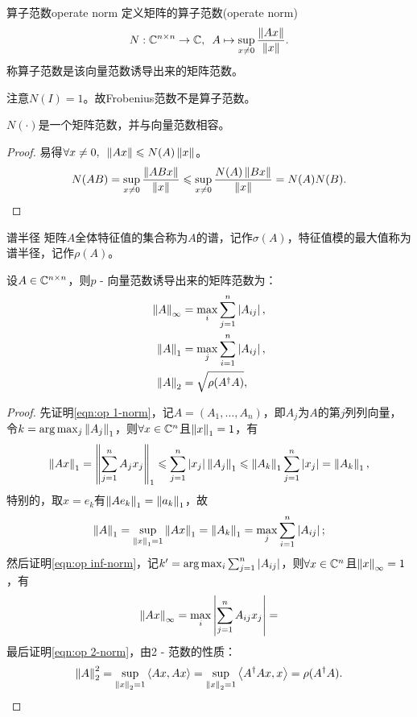 \begin{definition}
    {算子范数}{operate norm}
    定义矩阵的算子范数(operate norm)
    \begin{equation}
        N:\mathbb C^{n\times n}\to\mathbb C,\enspace A\mapsto\sup_{x\neq 0}\frac{\left\lVert Ax\right\rVert}{\left\lVert x\right\rVert}.
    \end{equation}
    称算子范数是该向量范数诱导出来的矩阵范数。
\end{definition}

注意$N(I)=1$。故Frobenius范数不是算子范数。

\begin{theorem}
    {}{}
    $N(\cdot)$是一个矩阵范数，并与向量范数相容。 
\end{theorem}

\begin{proof}
    易得$\forall x\neq 0,\enspace\left\lVert Ax\right\rVert\leqslant N(A)\left\lVert x\right\rVert$。
    \[
        N(AB)=\sup_{x\neq 0}\frac{\left\lVert ABx\right\rVert}{\left\lVert x\right\rVert}\leqslant\sup_{x\neq 0}\frac{N(A)\left\lVert Bx\right\rVert}{\left\lVert x\right\rVert}=N(A)N(B).
        \qedhere
    \]
\end{proof}

\begin{definition}
    {谱半径}{}
    矩阵$A$全体特征值的集合称为$A$的谱，记作$\sigma(A)$，特征值模的最大值称为谱半径，记作$\rho(A)$。
\end{definition}

\begin{example}
    {}{}
    设$A\in\mathbb C^{n\times n}$，则$p$ - 向量范数诱导出来的矩阵范数为：
    \begin{subequations}
        \label{eqn:op norm}
        \begin{align}
            \label{eqn:op inf-norm}
            \left\lVert A\right\rVert_\infty&=\max_{i}\sum_{j=1}^n\left\lvert A_{ij}\right\rvert,\\
            \label{eqn:op 1-norm}
            \left\lVert A\right\rVert_1&=\max_{j}\sum_{i=1}^n\left\lvert A_{ij}\right\rvert,\\
            \label{eqn:op 2-norm}
            \left\lVert A\right\rVert_2&=\sqrt{\rho(A^\dagger A)},
        \end{align}
    \end{subequations}
    \begin{proof}
        先证明\eqref{eqn:op 1-norm}，记$A=(A_1,\ldots,A_n)$，即$A_j$为$A$的第$j$列列向量，令$k=\arg\max_j\left\lVert A_j\right\rVert_1$，则$\forall x\in\mathbb C^n$且$\left\lVert x\right\rVert_1=1$，有
        \[
            \left\lVert Ax\right\rVert_1=\left\lVert\sum_{j=1}^nA_jx_j\right\rVert_1\leqslant\sum_{j=1}^n\left\lvert x_j\right\rvert\left\lVert A_j\right\rVert_1\leqslant\left\lVert A_k\right\rVert_1\sum_{j=1}^n\left\lvert x_j\right\rvert=\left\lVert A_k\right\rVert_1,
        \]
        特别的，取$x=e_k$有$\left\lVert Ae_k\right\rVert_1=\left\lVert a_k\right\rVert_1$，故
        \[
            \left\lVert A\right\rVert_1=\sup_{\left\lVert x\right\rVert_1=1}\left\lVert Ax\right\rVert_1=\left\lVert A_k\right\rVert_1=\max_{j}\sum_{i=1}^n\left\lvert A_{ij}\right\rvert;
        \]
        然后证明\eqref{eqn:op inf-norm}，记$k'=\arg\max_i\sum_{j=1}^n\left\lvert A_{ij}\right\rvert$，则$\forall x\in\mathbb C^n$且$\left\lVert x\right\rVert_\infty=1$，有
        \[
            \left\lVert Ax\right\rVert_\infty=\max_i\left\lvert\sum_{j=1}^nA_{ij}x_j\right\rvert=
        \]
        最后证明\eqref{eqn:op 2-norm}，由2 - 范数的性质：
        \[
            \left\lVert A\right\rVert_2^2=\sup_{\left\lVert x\right\rVert_2=1}\left\langle Ax,Ax\right\rangle=\sup_{\left\lVert x\right\rVert_2=1}\left\langle A^\dagger Ax,x\right\rangle=\rho(A^\dagger A).
            \qedhere
        \]
    \end{proof}
\end{example}

